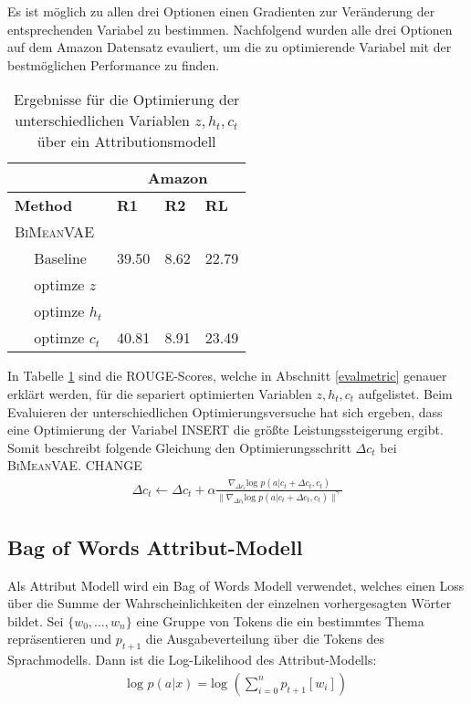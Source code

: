 Es ist möglich zu allen drei Optionen einen Gradienten zur Veränderung der entsprechenden Variabel zu bestimmen.
Nachfolgend wurden alle drei Optionen auf dem Amazon Datensatz evauliert, um die zu optimierende Variabel mit der bestmöglichen Performance zu finden.

\begin{table}[h!]
    \centering
    \begin{tabular}{@{}llll@{}}
    \toprule
                       & \multicolumn{3}{c}{Amazon}              \\ \midrule
    \textbf{Method}    & \textbf{R1} & \textbf{R2} & \textbf{RL} \\ \midrule
    \textsc{BiMeanVAE} &             &             &             \\
    $\quad$ Baseline        & 39.50       & 8.62      &  22.79     \\
    $\quad$ optimze $z$        &        &       &       \\
    $\quad$ optimze $h_t$      &     &      &    \\
    $\quad$ optimze $c_t$      &  40.81   &     8.91  &   23.49    \\ \bottomrule
    \end{tabular}
    \caption{Ergebnisse für die Optimierung der unterschiedlichen Variablen $z,h_t,c_t$ über ein Attributionsmodell}
    \label{opt_bimeanvae}
\end{table}

In Tabelle \ref{opt_bimeanvae} sind die ROUGE-Scores, welche in Abschnitt \ref{evalmetric} genauer erklärt werden, für die separiert optimierten Variablen $z, h_t, c_t$ aufgelistet.
Beim Evaluieren der unterschiedlichen Optimierungsversuche hat sich ergeben, dass eine Optimierung der Variabel INSERT die größte Leistungssteigerung ergibt.
Somit beschreibt folgende Gleichung den Optimierungsschritt $\Delta c_t$ bei \textsc{BiMeanVAE}.
CHANGE
\begin{align*}
    \Delta c_t \leftarrow \Delta c_t + \alpha \frac{\nabla_{\Delta c_t} \text{log }p(a|c_t+\Delta c_t,c_t)}{\| \nabla_{\Delta c_t} \text{log }p(a|c_t +\Delta c_t ,c_t )\|^\gamma}
\end{align*}


\subsection{Bag of Words Attribut-Modell}
Als Attribut Modell wird ein Bag of Words Modell verwendet, welches einen Loss über die Summe der Wahrscheinlichkeiten der einzelnen vorhergesagten Wörter bildet.
Sei $\{w_0, \ldots, w_n\}$ eine Gruppe von Tokens die ein bestimmtes Thema repräsentieren und $p_{t+1}$ die Ausgabeverteilung über die Tokens des Sprachmodells.
Dann ist die Log-Likelihood des Attribut-Modells: 
\begin{align*}
    \text{log }p(a|x) = \text{log }(\sum_{i=0}^n p_{t+1}[w_i])
\end{align*}

